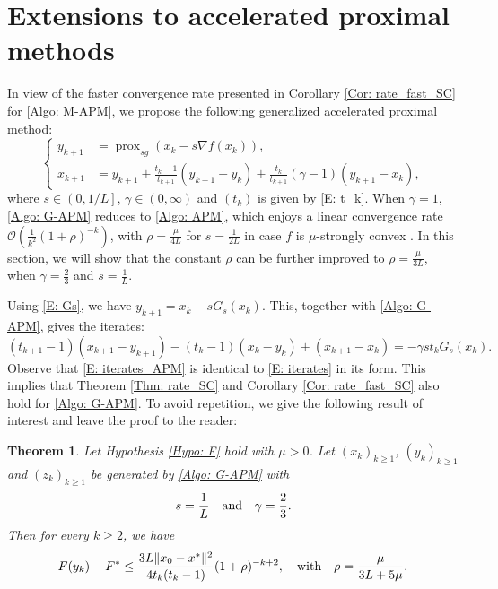 \documentclass[pdflatex,sn-mathphys-num]{sn-jnl}
\theoremstyle{thmstyleone}
\newtheorem{theorem}{Theorem}
\theoremstyle{thmstyletwo}
\theoremstyle{thmstylethree}
\DeclareMathOperator{\prox}{prox}
\newcommand{\qbox}[1]{\quad\hbox{#1}\quad}
\begin{document}
\section{Extensions to accelerated proximal methods}\label{Sec: extensions}
In view of the faster convergence rate presented in Corollary \ref{Cor: rate_fast_SC} for \eqref{Algo: M-APM}, we propose the following generalized accelerated proximal method:
\begin{equation}\label{Algo: G-APM}\tag{G-APM}
\left\{
\begin{aligned}
y_{k+1} &= \prox_{sg}\left( x_k - s\nabla f(x_k) \right),\\
x_{k+1} &= y_{k+1} + \frac{t_k-1}{t_{k+1}}(y_{k+1}-y_k) + \frac{t_k}{t_{k+1}}(\gamma-1)(y_{k+1}-x_k),
\end{aligned}
\right.
\end{equation}
where $s\in \left( 0, 1/L \right]$, $\gamma\in(0,\infty)$ and $(t_k)$ is given by \eqref{E: t_k}. When $\gamma=1$, \eqref{Algo: G-APM} reduces to \eqref{Algo: APM}, which enjoys a linear convergence rate $\mathcal{O}\left( \frac{1}{k^2}(1+\rho)^{-k}\right)$, with $\rho=\frac{\mu}{4L}$ for $s=\frac{1}{2L}$ in case $f$ is $\mu$-strongly convex \cite{Bao_2023}. In this section, we will show that the constant $\rho$ can be further improved to $\rho=\frac{\mu}{3L}$, when $\gamma=\frac{2}{3}$ and $s=\frac{1}{L}$.

Using \eqref{E: Gs}, we have $y_{k+1} = x_k - sG_s(x_k)$. This, together with \eqref{Algo: G-APM}, gives the iterates:
\begin{equation}\label{E: iterates_APM}
(t_{k+1}-1)(x_{k+1}-y_{k+1}) - (t_k-1)(x_k-y_k) + (x_{k+1}-x_k) = -\gamma s t_k G_s(x_k).
\end{equation} 
Observe that \eqref{E: iterates_APM} is identical to \eqref{E: iterates} in its form. This implies that Theorem \ref{Thm: rate_SC} and Corollary \ref{Cor: rate_fast_SC} also hold for \eqref{Algo: G-APM}. To avoid repetition, we give the following result of interest and leave the proof to the reader: 

\begin{theorem}\label{Thm: rate_SC_GAPM}
Let Hypothesis \ref{Hypo: F} hold with $\mu>0$. Let $(x_k)_{k\ge 1}$, $(y_k)_{k\ge 1}$ and $(z_k)_{k\ge 1}$ be generated by \eqref{Algo: G-APM} with 
$$s=\frac{1}{L} \qbox{and} \gamma=\frac{2}{3}.  $$
Then for every $k\ge 2$, we have 
$$ F(y_k) - F^* \le \frac{3L\| x_0 - x^* \|^2}{4 t_k(t_k-1)}(1+\rho)^{-k+2},\qbox{with}\rho = \frac{\mu}{3L+5\mu}.$$
\end{theorem}
\end{document}
